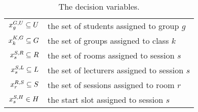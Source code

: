 \vspace*{-1em}
\begin{table}[ht]
\begin{center}
\begin{tabular}{|rl|}
\hline
$x^{G,U}_{g}\subseteq{U}$ & the set of students assigned to group $g$ \\
$x^{K,G}_{k}\subseteq{G}$ & the set of groups assigned to class $k$ \\
$x^{S,R}_{s}\subseteq{R}$ & the set of rooms assigned to session $s$ \\
$x^{S,L}_{s}\subseteq{L}$ & the set of lecturers assigned to session $s$ \\
$x^{R,S}_{r}\subseteq{S}$ & the set of sessions assigned to room $r$ \\
$x^{S,H}_{s}\in{H}$ & the start slot assigned to session $s$
\\
\hline
\end{tabular}
\caption{The decision variables.}
\label{table:cp-variables}
\end{center}
\end{table}







